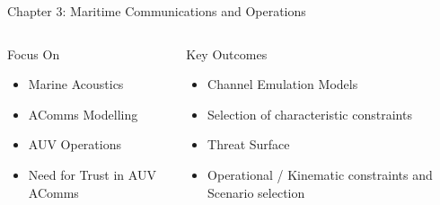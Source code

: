 \documentclass[aspectratio=43]{beamer}
\begin{document}
\begin{frame}{Chapter 3: Maritime Communications and Operations}
      \begin{columns}
		\begin{column}{0.5\textwidth}
			\begin{block}{Focus On}
				\begin{itemize}
					\item Marine Acoustics
					\item AComms Modelling 
					\item AUV Operations
					\item Need for Trust in AUV AComms
				\end{itemize}
			\end{block}
		\end{column}
		\begin{column}{0.5\textwidth}
			\begin{exampleblock}{Key Outcomes}
				\begin{itemize}
					\item Channel Emulation Models
					\item Selection of characteristic constraints
					\item Threat Surface
					\item Operational / Kinematic constraints and Scenario selection
				\end{itemize}
			\end{exampleblock}
		\end{column}
      \end{columns}
      
\end{frame}
\end{document}
